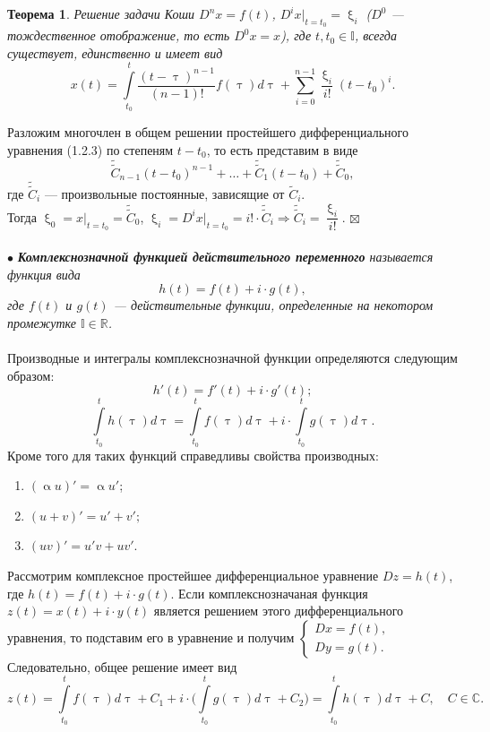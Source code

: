 \documentclass[a4paper, 12pt]{report}
\newenvironment{Proof} %
{\par\noindent{$\blacklozenge$}} %
{\hfill$\scriptstyle\boxtimes$}
\renewcommand{\alpha}{\upalpha}
\renewcommand{\xi}{\upxi}
\begin{document}
	\newtheorem*{1_2_4}{Теорема}\begin{1_2_4} Решение задачи Коши $D^nx = f(t)$, $D^ix|_{t=t_0} = \xi_i$ ($D^0$ --- тождественное отображение, то есть $D^0x = x$), где $t, t_0 \in \mathbb{I}$, всегда существует, единственно и имеет вид $$x(t) = \int\limits_{t_0}^{t}\dfrac{(t-\uptau)^{n-1}}{(n-1)!}f(\uptau)d\uptau + \sum\limits_{i=0}^{n-1}\dfrac{\xi_i}{i!}(t-t_0)^i.$$
	\end{1_2_4}\begin{Proof}
		Разложим многочлен в общем решении простейшего дифференциального уравнения (1.2.3) по степеням $t-t_0$, то есть представим в виде $$\widetilde{\widetilde{C}}_{n-1}(t-t_0)^{n-1} +\ldots + \widetilde{\widetilde{C}}_1(t-t_0) + \widetilde{\widetilde{C}}_0,$$ где $\widetilde{\widetilde{C}}_i$ --- произвольные постоянные, зависящие от $\widetilde{C}_i$.\\ Тогда $\xi_0 = x|_{t=t_0} = \widetilde{\widetilde{C}}_0$, $\xi_i = D^ix|_{t=t_0} = i!\cdot \widetilde{\widetilde{C}}_i\Rightarrow \widetilde{\widetilde{C}}_i = \dfrac{\xi_i}{i!}$.
	\end{Proof}\\\\
	$\bullet$ \textit{\textbf{Комплекснозначной функцией действительного переменного} называется функция вида $$h(t) = f(t) + i\cdot g(t),$$ где $f(t)$ и $g(t)$ --- действительные функции, определенные на некотором промежутке $\mathbb{I}\in\mathbb{R}$.}\\\\
	Производные и интегралы комплекснозначной функции определяются следующим образом: $$h'(t) = f'(t) + i\cdot g'(t);$$ $$\int\limits_{t_0}^th(\uptau)d\uptau = \int\limits_{t_0}^tf(\uptau)d\uptau + i\cdot \int\limits_{t_0}^tg(\uptau)d\uptau.$$
	Кроме того для таких функций справедливы свойства производных:\begin{enumerate}
		\item $(\alpha u)' = \alpha u'$;
		\item $(u+v)' = u' + v';$
		\item $(uv)' = u'v + uv'.$
	\end{enumerate}
	Рассмотрим комплексное простейшее дифференциальное уравнение $Dz = h(t)$, где $h(t) = f(t) + i\cdot g(t)$. Если комплекснозначаная функция $z(t) = x(t) + i\cdot y(t)$ является решением этого дифференциального уравнения, то подставим его в уравнение и получим $\begin{cases}Dx = f(t),\\Dy = g(t).\end{cases}$ Следовательно, общее решение имеет вид $$z(t) = \int\limits_{t_0}^tf(\uptau)d\uptau + C_1 + i\cdot \Big(\int\limits_{t_0}^tg(\uptau)d\uptau + C_2\Big) = \int\limits_{t_0}^th(\uptau)d\uptau + C,\quad C\in\mathbb{C}.$$
\end{document}
